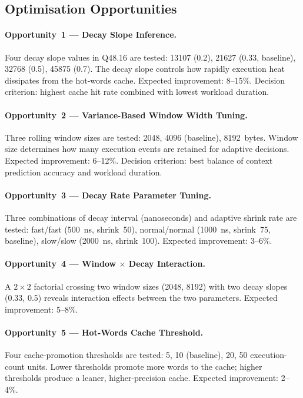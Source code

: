 \subsection{Optimisation Opportunities}

\paragraph{Opportunity~1 — Decay Slope Inference.}
Four decay slope values in Q48.16 are tested: 13107 (0.2), 21627 (0.33,
baseline), 32768 (0.5), 45875 (0.7). The decay slope controls how rapidly
execution heat dissipates from the hot-words cache. Expected improvement:
8--15\%. Decision criterion: highest cache hit rate combined with lowest
workload duration.

\paragraph{Opportunity~2 — Variance-Based Window Width Tuning.}
Three rolling window sizes are tested: 2048, 4096 (baseline), 8192~bytes.
Window size determines how many execution events are retained for adaptive
decisions. Expected improvement: 6--12\%. Decision criterion: best balance
of context prediction accuracy and workload duration.

\paragraph{Opportunity~3 — Decay Rate Parameter Tuning.}
Three combinations of decay interval (nanoseconds) and adaptive shrink rate
are tested: fast/fast (500~ns, shrink~50), normal/normal (1000~ns, shrink~75,
baseline), slow/slow (2000~ns, shrink~100). Expected improvement: 3--6\%.

\paragraph{Opportunity~4 — Window $\times$ Decay Interaction.}
A $2 \times 2$ factorial crossing two window sizes (2048, 8192) with two
decay slopes (0.33, 0.5) reveals interaction effects between the two
parameters. Expected improvement: 5--8\%.

\paragraph{Opportunity~5 — Hot-Words Cache Threshold.}
Four cache-promotion thresholds are tested: 5, 10 (baseline), 20, 50
execution-count units. Lower thresholds promote more words to the cache;
higher thresholds produce a leaner, higher-precision cache. Expected
improvement: 2--4\%.

